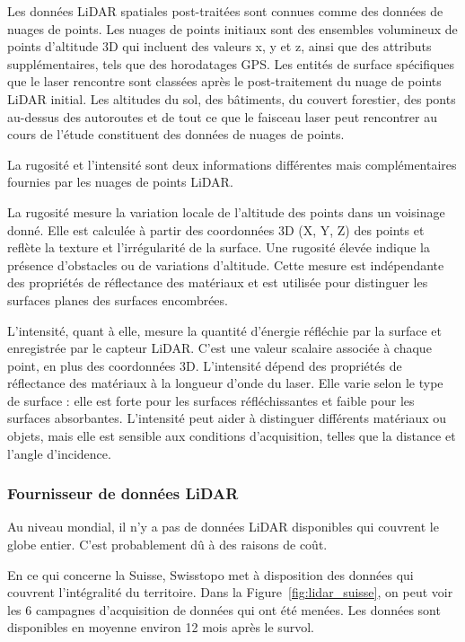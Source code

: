 Les données LiDAR spatiales post-traitées sont connues comme des données de nuages de points. Les nuages de points initiaux sont des ensembles volumineux de points d'altitude 3D qui incluent des valeurs x, y et z, ainsi que des attributs supplémentaires, tels que des horodatages GPS. Les entités de surface spécifiques que le laser rencontre sont classées après le post-traitement du nuage de points LiDAR initial. Les altitudes du sol, des bâtiments, du couvert forestier, des ponts au-dessus des autoroutes et de tout ce que le faisceau laser peut rencontrer au cours de l'étude constituent des données de nuages de points.

La rugosité et l'intensité sont deux informations différentes mais complémentaires fournies par les nuages de points LiDAR.

La rugosité mesure la variation locale de l'altitude des points dans un voisinage donné. Elle est calculée à partir des coordonnées 3D (X, Y, Z) des points et reflète la texture et l'irrégularité de la surface. Une rugosité élevée indique la présence d'obstacles ou de variations d'altitude. Cette mesure est indépendante des propriétés de réflectance des matériaux et est utilisée pour distinguer les surfaces planes des surfaces encombrées.

L'intensité, quant à elle, mesure la quantité d'énergie réfléchie par la surface et enregistrée par le capteur LiDAR. C'est une valeur scalaire associée à chaque point, en plus des coordonnées 3D. L'intensité dépend des propriétés de réflectance des matériaux à la longueur d'onde du laser. Elle varie selon le type de surface : elle est forte pour les surfaces réfléchissantes et faible pour les surfaces absorbantes. L'intensité peut aider à distinguer différents matériaux ou objets, mais elle est sensible aux conditions d'acquisition, telles que la distance et l'angle d'incidence.

\subsubsection{Fournisseur de données LiDAR}

Au niveau mondial, il n'y a pas de données LiDAR disponibles qui couvrent le globe entier. C'est probablement dû à des raisons de coût.

En ce qui concerne la Suisse, Swisstopo \citep{swisstopo_lidar_2024} met à disposition des données qui couvrent l'intégralité du territoire. Dans la Figure~\ref{fig:lidar_suisse}, on peut voir les 6 campagnes d'acquisition de données qui ont été menées. Les données sont disponibles en moyenne environ 12 mois après le survol.

